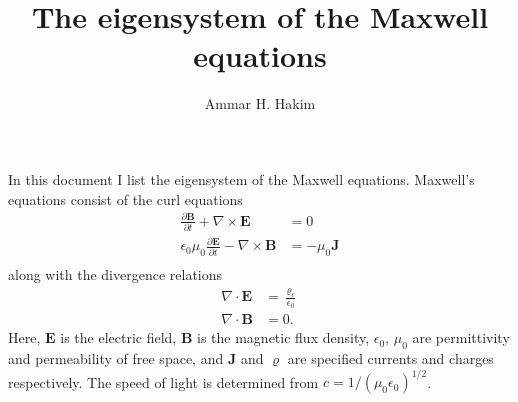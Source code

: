 \documentclass[11pt, reqno]{amsart}
\title[Maxwell Eigensystem]{The eigensystem of the Maxwell equations}%
\author{Ammar H. Hakim}%
\date{}
\newcommand{\mvec}[1]{\mathbf{#1}}
\theoremstyle{definition}
\begin{document}
\maketitle

In this document I list the eigensystem of the Maxwell
equations. Maxwell's equations consist of the curl equations
\begin{align}
  \frac{\partial \mvec{B}}{\partial t} + \nabla\times\mvec{E} &= 0 \\
  \epsilon_0\mu_0\frac{\partial \mvec{E}}{\partial t} -
  \nabla\times\mvec{B} &= -\mu_0\mvec{J} \\
\end{align}
along with the divergence relations
\begin{align}
  \nabla\cdot\mvec{E} &= \frac{\varrho_c}{\epsilon_0} \\
  \nabla\cdot\mvec{B} &= 0.
\end{align}
Here, $\mvec{E}$ is the electric field, $\mvec{B}$ is the magnetic
flux density, $\epsilon_0$, $\mu_0$ are permittivity and permeability
of free space, and $\mvec{J}$ and $\varrho$ are specified currents and
charges respectively. The speed of light is determined from
$c=1/(\mu_0\epsilon_0)^{1/2}$.
\end{document}
